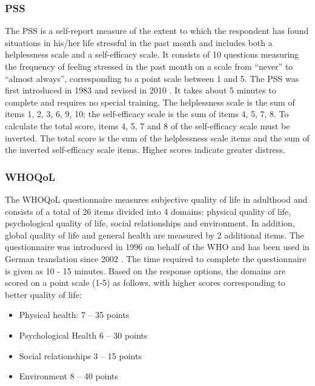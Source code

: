 \QPsychometrics{}

\subsubsection{\acf{PSS}}
\label{questionnaires:PSS}
The \ac{PSS} is a self-report measure of the extent to which the respondent has found situations in his/her life stressful in the past month and includes both a helplessness scale and a self-efficacy scale. It consists of 10 questions measuring the frequency of feeling stressed in the past month on a scale from ``never'' to ``almost always'', corresponding to a point scale between 1 and 5. The \ac{PSS} was first introduced in 1983 \cite{cohen1983pss} and revised in 2010 \cite{schneider2020pss}. It takes about 5 minutes to complete and requires no special training. The helplessness scale is the sum of items 1, 2, 3, 6, 9, 10; the self-efficacy scale is the sum of items 4, 5, 7, 8. To calculate the total score, items 4, 5, 7 and 8 of the self-efficacy scale must be inverted. The total score is the sum of the helplessness scale items and the sum of the inverted self-efficacy scale items. Higher scores indicate greater distress.

\QPsychometrics{}

\subsubsection{\acf{WHOQoL}}
\label{questionnaires:WHOQoL}

The \ac{WHOQoL} questionnaire measures subjective quality of life in adulthood and consists of a total of 26 items divided into 4 domains: physical quality of life, psychological quality of life, social relationships and environment. In addition, global quality of life and general health are measured by 2 additional items. The questionnaire was introduced in 1996 \cite{world1996whoqol} on behalf of the \ac{WHO} and has been used in German translation since 2002 \cite{gunzelmann2002whoqol}. The time required to complete the questionnaire is given as 10 - 15 minutes. Based on the response options, the domains are scored on a point scale (1-5) as follows, with higher scores corresponding to better quality of life:

\QScores{}
\begin{itemize}\itemsep2pt
\item Physical health: 7 -- 35 points
\item Psychological Health 6 -- 30 points
\item Social relationships 3 -- 15 points 
\item Environment 8 – 40 points
\end{itemize}

